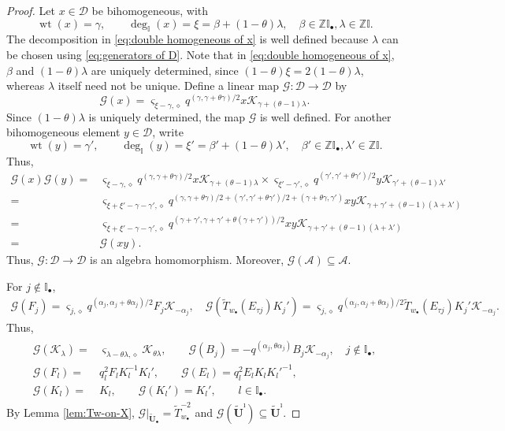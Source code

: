 \documentclass[a4paper,reqno,12pt]{amsart}
\numberwithin{equation}{section}
\theoremstyle{definition}
\theoremstyle{plain}
\theoremstyle{definition}
\def\Z{\mathbb Z}
\def\I{\mathbb I}
\def\bI{\I_\bullet}
\def\bw{w_\bullet}
\def\tU{\widetilde{\mathbf U}}
\def\tUi{\widetilde{\mathbf U}^{\imath}}
\def \tbU{\tU_{\bullet}}
\def\tTD{\widetilde T}
\def\cA{\mathcal A}
\def\cK{\mathcal K}
\def\cD{\mathcal D}
\def\cG{\mathcal G}
\def\vs{\varsigma}
\def\dm{\diamond}
\newcommand{\wt}{\operatorname{wt}}
\begin{document}
\begin{proof}
 Let $x\in\cD$ be bihomogeneous, with 
 \begin{equation}\label{eq:double homogeneous of x}
  \wt(x)=\gamma,\qquad \deg_\I(x)=\xi=\beta+(1-\theta)\lambda,\quad \beta\in\Z\bI,\lambda\in\Z\I.   
 \end{equation}
 The decomposition in \eqref{eq:double homogeneous of x} is well defined because $\lambda$ can be chosen using \eqref{eq:generators of D}. Note that in \eqref{eq:double homogeneous of x}, $\beta$ and $(1-\theta)\lambda$ are uniquely determined, since $(1-\theta)\xi=2(1-\theta)\lambda$, whereas $\lambda$ itself need not be unique.
 Define a linear map $\cG:\cD\rightarrow\cD$ by 
 \begin{equation}\label{eq:def-cG}
 \cG(x)=\vs_{\xi-\gamma,\dm}q^{(\gamma,\gamma+\theta \gamma)/2}x\cK_{\gamma+(\theta-1)\lambda} .
 \end{equation}
 Since $(1-\theta)\lambda$ is uniquely determined, the map $\cG$ is well defined. For another bihomogeneous element $y\in\cD$, write
 \begin{equation*}
  \wt(y)=\gamma',\qquad \deg_\I(y)=\xi'=\beta'+(1-\theta)\lambda',\quad \beta'\in\Z\bI,\lambda'\in\Z\I.   
 \end{equation*}
 Thus,
 \begin{align*}
    \cG(x)\cG(y)=&\vs_{\xi-\gamma,\dm}q^{(\gamma,\gamma+\theta \gamma)/2}x\cK_{\gamma+(\theta-1)\lambda}\times\vs_{\xi'-\gamma',\dm}q^{(\gamma',\gamma'+\theta \gamma')/2}y\cK_{\gamma'+(\theta-1)\lambda'}\\
    =&\vs_{\xi+\xi'-\gamma-\gamma',\dm}q^{(\gamma,\gamma+\theta \gamma)/2+(\gamma',\gamma'+\theta \gamma')/2+(\gamma+\theta\gamma,\gamma')}xy\cK_{\gamma+\gamma'+(\theta-1)(\lambda+\lambda')}\\
    =&\vs_{\xi+\xi'-\gamma-\gamma',\dm}q^{(\gamma+\gamma',\gamma+\gamma'+\theta (\gamma+\gamma'))/2}xy\cK_{\gamma+\gamma'+(\theta-1)(\lambda+\lambda')}\\
    =&\cG(xy).
 \end{align*}
 Thus, $\cG:\cD\rightarrow\cD$ is an algebra homomorphism. Moreover, $\cG(\cA)\subseteq\cA$. 
 
 For $j\notin\bI$,
 \begin{align*}
     \cG(F_j)=\vs_{j,\dm}q^{(\alpha_j,\alpha_j+\theta \alpha_j)/2}F_j\cK_{-\alpha_j},\quad \cG(\tTD_{\bw}(E_{\tau j})K_j')=\vs_{j,\dm}q^{(\alpha_j,\alpha_j+\theta \alpha_j)/2}\tTD_{\bw}(E_{\tau j})K_j'\cK_{-\alpha_j}.   
 \end{align*}
 Thus,
 \begin{align}\label{eq:compute}
     \begin{split}
    \cG(\cK_\lambda)=&\vs_{\lambda-\theta\lambda,\dm}\cK_{\theta\lambda},\qquad\cG(B_j)=- q^{(\alpha_j,\theta \alpha_j)}B_j\cK_{-\alpha_j},\quad j\notin\bI,\\
    \cG(F_l)=&q_l^2F_lK_l^{-1}K_l',\qquad \cG(E_l)=q_l^2E_lK_lK_l'^{-1},\\
    \cG(K_l)=&K_l,\qquad \cG(K_l')=K_l',\qquad l\in\bI.
 \end{split}
 \end{align}
 By Lemma \ref{lem:Tw-on-X}, $\cG|_{\tbU}=\tTD_{\bw}^{-2}$ and $\cG(\tUi)\subseteq\tUi$.


\end{proof}
\end{document}
